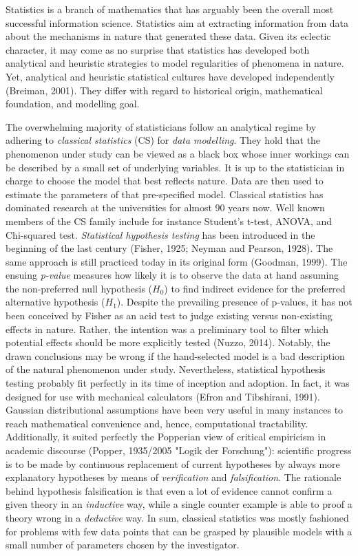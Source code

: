 \documentclass[authoryear,review,3p]{elsarticle}
\begin{document}
Statistics is a branch of mathematics that has arguably been the
overall most successful information science.
Statistics aim at extracting information from data
about the mechanisms in nature that generated these data.
%
Given its eclectic character, it may come as no surprise that statistics
has developed both analytical and heuristic strategies
to model regularities of phenomena in nature.
Yet, analytical and heuristic statistical cultures
have developed independently (Breiman, 2001).
They differ with regard to historical origin, mathematical foundation,
and modelling goal.

The overwhelming majority of statisticians
follow an analytical regime by
adhering to \textit{classical statistics} (CS) for
\textit{data modelling}.
They hold that the phenomenon under study can be viewed as a black box
whose inner workings can be described by a small set of
underlying variables.
It is up to the statistician in charge
to choose the model that best reflects nature.
Data are then used to estimate the parameters of that pre-specified model.
Classical statistics has dominated research at the universities
for almost 90 years now.
%
Well known members of the CS family include for instance
Student's t-test, ANOVA,
and Chi-squared test.
\textit{Statistical hypothesis testing} has been introduced in the beginning
of the last century (Fisher, 1925; Neyman and Pearson, 1928).
The same approach is still practiced today in its original form (Goodman, 1999).  
%
The ensuing \textit{p-value} measures how likely it is
to observe the data at hand
assuming the non-preferred null hypothesis ($H_0$)
to find indirect evidence
for the preferred alternative hypothesis ($H_1$).
%
Despite the prevailing presence of p-values,
it has not been conceived by Fisher as an acid test
to judge existing versus non-existing effects in nature.
Rather, the intention was a preliminary tool to
filter which potential effects should be more explicitly tested (Nuzzo, 2014).
%
Notably, the drawn conclusions may be wrong
if the hand-selected model is a bad description of
the natural phenomenon under study.
%
Nevertheless, statistical hypothesis testing probably fit perfectly
in its time of inception and adoption.
In fact, it was designed for use with mechanical calculators
(Efron and Tibshirani, 1991).
Gaussian distributional assumptions
have been very useful in many instances to reach
mathematical convenience and, hence, computational tractability.
Additionally, it suited perfectly the Popperian view of
critical empiricism in academic discourse
(Popper, 1935/2005 "Logik der Forschung"):
scientific progress is to be made by continuous replacement of current
hypotheses by always more explanatory hypotheses
by means of \textit{verification} and \textit{falsification}.
The rationale behind hypothesis falsification
is that even a lot of evidence cannot confirm
a given theory in an \textit{inductive} way, 
while a single counter example is able to proof a theory wrong
in a \textit{deductive} way.
%
In sum,
classical statistics was mostly fashioned
for problems with few data points that can be grasped 
by plausible models with a small number of parameters chosen by the
investigator.
\end{document}
